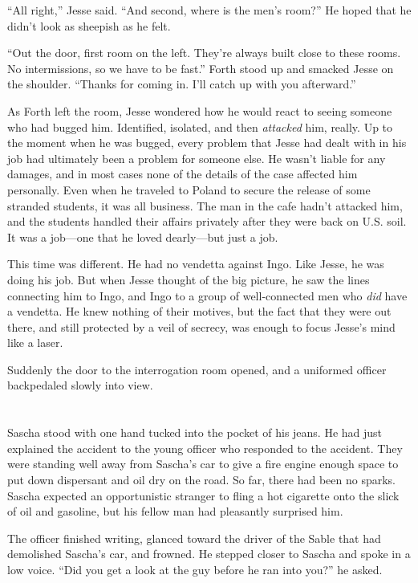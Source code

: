 \documentclass[12pt]{book}
\begin{document}
``All right,'' Jesse said.  ``And second, where is the men's room?''  He hoped that he didn't look as sheepish as he felt.

``Out the door, first room on the left.  They're always built close to these rooms.  No intermissions, so we have to be fast.''  Forth stood up and smacked Jesse on the shoulder.  ``Thanks for coming in.  I'll catch up with you afterward.''

As Forth left the room, Jesse wondered how he would react to seeing someone who had bugged him.  Identified, isolated, and then \emph{attacked} him, really.  Up to the moment when he was bugged, every problem that Jesse had dealt with in his job had ultimately been a problem for someone else.  He wasn't liable for any damages, and in most cases none of the details of the case affected him personally.  Even when he traveled to Poland to secure the release of some stranded students, it was all business.  The man in the cafe hadn't attacked him, and the students handled their affairs privately after they were back on U.S. soil.  It was a job---one that he loved dearly---but just a job.

This time was different.  He had no vendetta against Ingo.  Like Jesse, he was doing his job.  But when Jesse thought of the big picture, he saw the lines connecting him to Ingo, and Ingo to a group of well-connected men who \emph{did} have a vendetta.  He knew nothing of their motives, but the fact that they were out there, and still protected by a veil of secrecy, was enough to focus Jesse's mind like a laser.

Suddenly the door to the interrogation room opened, and a uniformed officer backpedaled slowly into view.

\chapter{}

Sascha stood with one hand tucked into the pocket of his jeans.  He had just explained the accident to the young officer who responded to the accident.  They were standing well away from Sascha's car to give a fire engine enough space to put down dispersant and oil dry on the road.  So far, there had been no sparks.  Sascha expected an opportunistic stranger to fling a hot cigarette onto the slick of oil and gasoline, but his fellow man had pleasantly surprised him.

The officer finished writing, glanced toward the driver of the Sable that had demolished Sascha's car, and frowned.  He stepped closer to Sascha and spoke in a low voice.  ``Did you get a look at the guy before he ran into you?'' he asked.
\end{document}
